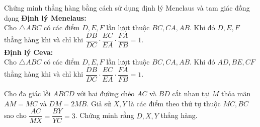 
\begin{dang}{Chứng minh thẳng hàng bằng cách sử dụng định lý Menelaus và tam giác đồng dạng}
	\textbf{Định lý Menelaus:}
	\\ Cho $\triangle ABC$ có các điểm $D,E,F$ lần lượt thuộc $BC,CA,AB$. Khi đó $D,E,F$ thẳng hàng khi và chỉ khi $\dfrac{DB}{DC}\cdot\dfrac{EC}{EA}\cdot\dfrac{FA}{FB}=1$.
	\\ \textbf{Định lý Ceva:}
	\\ Cho $\triangle ABC$ có các điểm $D,E,F$ lần lượt thuộc $BC,CA,AB$. Khi đó $AD,BE,CF$ thẳng hàng khi và chỉ khi $\dfrac{DB}{DC}\cdot\dfrac{EC}{EA}\cdot\dfrac{FA}{FB}=1$.
\end{dang}

\begin{ex}%
	Cho đa giác lồi $ABCD$ với hai đường chéo $AC$ và $BD$ cắt nhau tại $M$ thỏa mãn $AM=MC$ và $DM=2MB$. Giả sử $X,Y$ là các điểm theo thứ tự thuộc $MC,BC$ sao cho $\dfrac{AC}{MX}=\dfrac{BY}{YC}=3$. Chứng minh rằng $D,X,Y$ thẳng hàng.
\end{ex}

